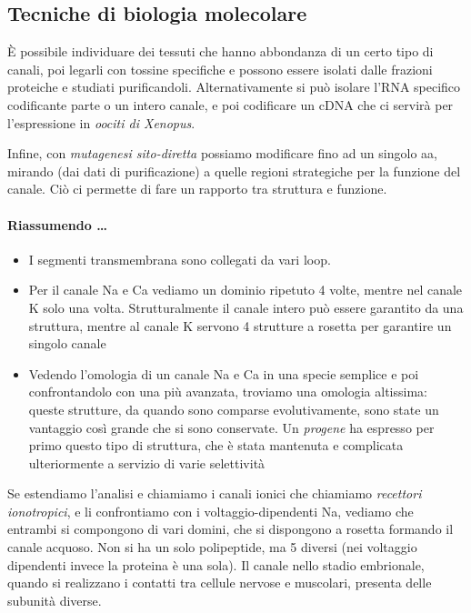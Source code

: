 \documentclass[a4paper,12pt]{article}
\begin{document}
\subsection{Tecniche di biologia molecolare}
È possibile individuare dei tessuti che hanno abbondanza di un certo tipo di canali, poi legarli con tossine specifiche e possono essere isolati dalle frazioni proteiche e studiati purificandoli. Alternativamente si può isolare l'RNA specifico codificante parte o un intero canale, e poi codificare un cDNA che ci servirà per l'espressione in \emph{oociti di Xenopus}.

Infine, con \emph{mutagenesi sito-diretta} possiamo modificare fino ad un singolo aa, mirando (dai dati di purificazione) a quelle regioni strategiche per la funzione del canale. Ciò ci permette di fare un rapporto tra struttura e funzione.

\paragraph{Riassumendo \dots}
\begin{itemize}
\item{I segmenti transmembrana sono collegati da vari loop.}
\item{Per il canale Na e Ca vediamo un dominio ripetuto 4 volte, mentre nel canale K solo una volta. Strutturalmente il canale intero può essere garantito da una struttura, mentre al canale K servono 4 strutture a rosetta per garantire un singolo canale}
\item{Vedendo l'omologia di un canale Na e Ca in una specie semplice e poi confrontandolo con una più avanzata, troviamo una omologia altissima: queste strutture, da quando sono comparse evolutivamente, sono state un vantaggio così grande che si sono conservate. Un \emph{progene} ha espresso per primo questo tipo di struttura, che è stata mantenuta e complicata ulteriormente a servizio di varie selettività}
\end{itemize} 


Se estendiamo l'analisi e chiamiamo i canali ionici che chiamiamo \emph{recettori ionotropici}, e li confrontiamo con i voltaggio-dipendenti Na, vediamo che entrambi si compongono di vari domini, che si dispongono a rosetta formando il canale acquoso. Non si ha un solo polipeptide, ma 5 diversi (nei voltaggio dipendenti invece la proteina è una sola). Il canale nello stadio embrionale, quando si realizzano i contatti tra cellule nervose e muscolari, presenta delle subunità diverse.
\end{document}
